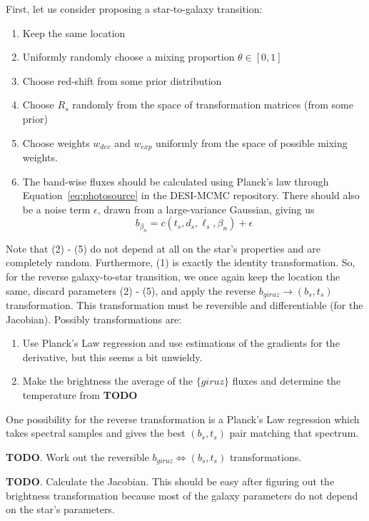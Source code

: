 \documentclass[11pt]{article}
\begin{document}
First, let us consider proposing a star-to-galaxy transition:
\begin{enumerate}
\item Keep the same location
\item Uniformly randomly choose a mixing proportion $\theta \in [0, 1]$
\item Choose red-shift from some prior distribution
\item Choose $R_s$ randomly from the space of transformation matrices (from some prior)
\item Choose weights $w_{dev}$ and $w_{exp}$ uniformly from the space of possible mixing weights.
\item The band-wise fluxes should be calculated using Planck's law through Equation~\ref{eq:photosource}
in the DESI-MCMC repository. There should also be a noise term $\epsilon$, drawn from a large-variance Gaussian, giving us
\begin{equation}
b_{\beta_n} = c(t_s, d_s, \ell_s, \beta_n) + \epsilon
\end{equation}
\end{enumerate}

Note that (2) - (5) do not depend at all on the star's properties and are completely random. Furthermore, (1)
is exactly the identity transformation. So, for the reverse galaxy-to-star transition, we once again keep the location the same,
discard parameters (2) - (5), and apply the reverse $b_{giruz} \to (b_s, t_s)$ transformation. This
transformation must be reversible and differentiable (for the Jacobian). Possibly transformations are:
\begin{enumerate}
\item Use Planck's Law regression and use estimations of the gradients for the derivative, but this seems a bit unwieldy.
\item Make the brightness the average of the $\{giruz\}$ fluxes and determine the temperature from \textbf{TODO}
\end{enumerate}

One possibility for
the reverse transformation is a Planck's Law regression which takes spectral samples and gives the best $(b_s, t_s)$ pair
matching that spectrum.

\textbf{TODO}. Work out the reversible $b_{giruz} \iff (b_s, t_s)$ transformations.

\textbf{TODO}. Calculate the Jacobian. This should be easy after figuring out the brightness transformation because
most of the galaxy parameters do not depend on the star's parameters.
\end{document}
